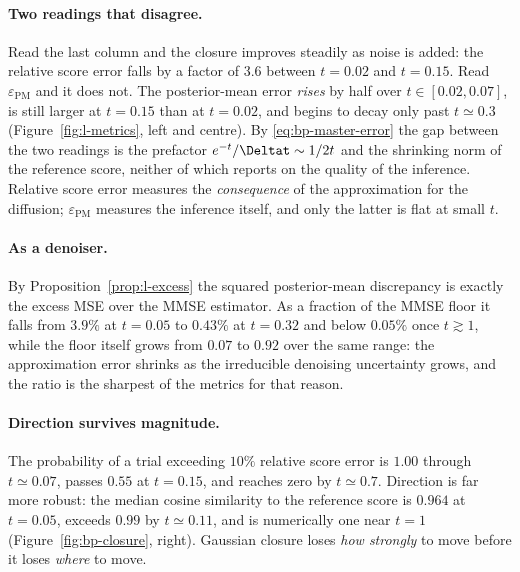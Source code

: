 \paragraph{Two readings that disagree.}
Read the last column and the closure improves steadily as noise is added: the
relative score error falls by a factor of $3.6$ between $t=0.02$ and $t=0.15$.
Read $\varepsilon_{\mathrm{PM}}$ and it does not. The posterior-mean error
\emph{rises} by half over $t\in[0.02,0.07]$, is still larger at $t=0.15$ than
at $t=0.02$, and begins to decay only past $t\simeq0.3$
(Figure~\ref{fig:l-metrics}, left and centre). By \eqref{eq:bp-master-error}
the gap between the two readings is the prefactor $e^{-t}/\Deltat\sim1/2t$ and
the shrinking norm of the reference score, neither of which reports on the
quality of the inference. Relative score error measures the \emph{consequence}
of the approximation for the diffusion; $\varepsilon_{\mathrm{PM}}$ measures
the inference itself, and only the latter is flat at small $t$.

\paragraph{As a denoiser.}
By Proposition~\ref{prop:l-excess} the squared posterior-mean discrepancy is
exactly the excess MSE over the MMSE estimator. As a fraction of the MMSE
floor it falls from $3.9\%$ at $t=0.05$ to $0.43\%$ at $t=0.32$ and below
$0.05\%$ once $t\gtrsim1$, while the floor itself grows from $0.07$ to $0.92$
over the same range: the approximation error shrinks as the irreducible
denoising uncertainty grows, and the ratio is the sharpest of the metrics for
that reason.

\paragraph{Direction survives magnitude.}
The probability of a trial exceeding $10\%$ relative score error is $1.00$
through $t\simeq0.07$, passes $0.55$ at $t=0.15$, and reaches zero by
$t\simeq0.7$. Direction is far more robust: the median cosine similarity to
the reference score is $0.964$ at $t=0.05$, exceeds $0.99$ by $t\simeq0.11$,
and is numerically one near $t=1$ (Figure~\ref{fig:bp-closure}, right).
Gaussian closure loses \emph{how strongly} to move before it loses
\emph{where} to move.

